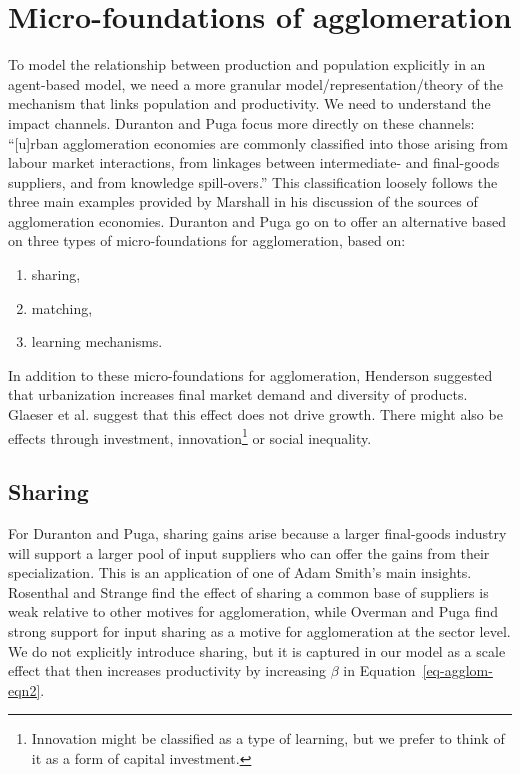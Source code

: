 \section{Micro-foundations of agglomeration}
To model the relationship between production and population explicitly in an agent-based model, we need a more granular model/representation/theory of the mechanism that links population and productivity. We need to understand the impact channels. 
Duranton and Puga \cite{durantonMicroFoundationsUrbanAgglomeration2004} focus more directly on these channels: ``[u]rban agglomeration economies are commonly classified into those arising from labour market interactions, from linkages between intermediate- and final-goods suppliers, and from knowledge spill-overs.'' This classification loosely follows the three main examples provided by Marshall \cite{marshallPrinciplesEconomics1890} in his discussion of the sources of agglomeration economies.  Duranton and Puga go on to offer an alternative based on three types of micro-foundations for agglomeration, based on:
\begin{enumerate}
\item sharing,
\item matching, 
\item learning mechanisms.
\end{enumerate}
In addition to these micro-foundations for agglomeration, Henderson \cite{Henderson1972Sizes} suggested that urbanization increases final market demand and diversity of products. Glaeser et al. \cite{glaeserGrowthCities1991a} suggest that this effect does not drive growth. There might also be effects through investment, innovation\footnote{Innovation might be classified as a type of learning, but we prefer to think of it as a form of capital investment.} or social inequality. 



 
\subsection{Sharing}
For Duranton and Puga, sharing gains arise because a larger final-goods industry will support a larger pool of input suppliers who can offer the gains from their specialization. This is an application of one of Adam Smith's main insights. Rosenthal and Strange \cite{rosenthalEvidenceNatureSources2004} find the effect of sharing a common base of suppliers is weak relative to other motives for agglomeration, while  Overman and Puga \cite{overmanLaborPoolingSource2010} find strong support for input sharing as a motive for agglomeration at the sector level. We do not explicitly introduce sharing, but it is captured in our model as a scale effect that then increases productivity by increasing  $\beta$ in Equation~\ref{eq-agglom-eqn2}. 

